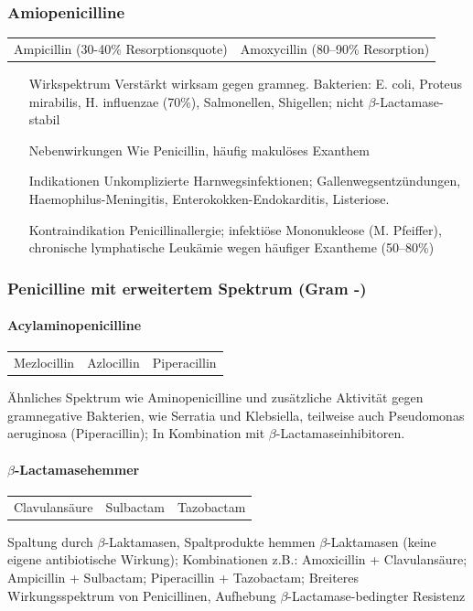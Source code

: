 \documentclass[10pt,a4paper]{report}
\begin{document}
\subsubsection{Amiopenicilline} %
\label{ssub:amiopenicilline}
\begin{tabularx}{\textwidth}{XX}
Ampicillin	(30-40\% Resorptionsquote)&Amoxycillin (80–90\% Resorption)\\ 
\end{tabularx}
\begin{itemize}
	\item[Wirkspektrum] Verstärkt wirksam gegen gramneg. Bakterien: E. coli, Proteus mirabilis, H. influenzae (70\%), Salmonellen, Shigellen; nicht $\beta$-Lactamase-stabil
	\item[Nebenwirkungen] Wie Penicillin, häufig makulöses Exanthem
	\item[Indikationen] Unkomplizierte Harnwegsinfektionen; Gallenwegsentzündungen, Haemophilus-Meningitis, Enterokokken-Endokarditis, Listeriose.
	\item[Kontraindikation] Penicillinallergie; infektiöse Mononukleose (M. Pfeiffer), chronische lymphatische Leukämie wegen häufiger Exantheme (50–80\%)
\end{itemize}
\subsubsection{Penicilline mit erweitertem Spektrum (Gram -)} %
\paragraph{Acylaminopenicilline} %
\label{par:acylaminopenicilline}
\begin{tabularx}{\textwidth}{XXX}
Mezlocillin&Azlocillin&Piperacillin\\ 
\end{tabularx}
Ähnliches Spektrum wie Aminopenicilline und zusätzliche Aktivität gegen gramnegative Bakterien, wie Serratia und Klebsiella, teilweise auch Pseudomonas aeruginosa (Piperacillin); In Kombination mit $\beta$-Lactamaseinhibitoren.
\paragraph{$\beta$-Lactamasehemmer} %
\label{par:paragraph_name}
\begin{tabularx}{\textwidth}{XXX}
Clavulansäure&Sulbactam&Tazobactam\\ 
\end{tabularx}
Spaltung durch $\beta$-Laktamasen, Spaltprodukte hemmen $\beta$-Laktamasen (keine eigene antibiotische Wirkung); Kombinationen z.B.: Amoxicillin + Clavulansäure; Ampicillin + Sulbactam; Piperacillin + Tazobactam;  Breiteres Wirkungsspektrum von Penicillinen, Aufhebung $\beta$-Lactamase-bedingter Resistenz
\end{document}
